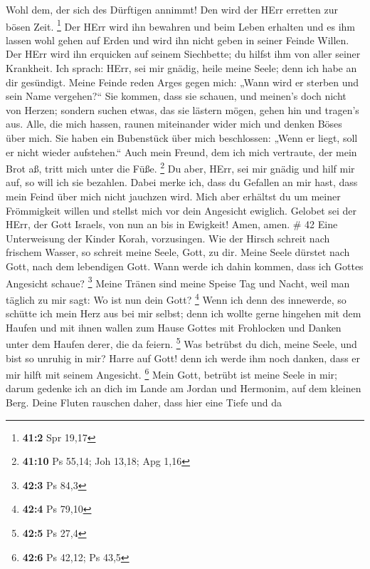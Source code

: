  Wohl dem, der sich des Dürftigen annimmt! Den wird der HErr
erretten zur bösen Zeit. \footnote{\textbf{41:2} Spr 19,17} 
Der HErr wird ihn bewahren und beim Leben erhalten und es ihm lassen
wohl gehen auf Erden und wird ihn nicht geben in seiner Feinde Willen.
 Der HErr wird ihn erquicken auf seinem Siechbette; du
hilfst ihm von aller seiner Krankheit.  Ich sprach: HErr,
sei mir gnädig, heile meine Seele; denn ich habe an dir gesündigt.
 Meine Feinde reden Arges gegen mich: „Wann wird er sterben
und sein Name vergehen?{}``  Sie kommen, dass sie schauen,
und meinen's doch nicht von Herzen; sondern suchen etwas, das sie
lästern mögen, gehen hin und tragen's aus.  Alle, die mich
hassen, raunen miteinander wider mich und denken Böses über mich.
 Sie haben ein Bubenstück über mich beschlossen: „Wenn er
liegt, soll er nicht wieder aufstehen.``  Auch mein Freund,
dem ich mich vertraute, der mein Brot aß, tritt mich unter die Füße.
\footnote{\textbf{41:10} Ps 55,14; Joh 13,18; Apg 1,16}  Du
aber, HErr, sei mir gnädig und hilf mir auf, so will ich sie bezahlen.
 Dabei merke ich, dass du Gefallen an mir hast, dass mein
Feind über mich nicht jauchzen wird.  Mich aber erhältst du
um meiner Frömmigkeit willen und stellst mich vor dein Angesicht
ewiglich.  Gelobet sei der HErr, der Gott Israels, von nun
an bis in Ewigkeit! Amen, amen. \# 42  Eine Unterweisung der
Kinder Korah, vorzusingen.  Wie der Hirsch schreit nach
frischem Wasser, so schreit meine Seele, Gott, zu dir. 
Meine Seele dürstet nach Gott, nach dem lebendigen Gott. Wann werde ich
dahin kommen, dass ich Gottes Angesicht schaue? \footnote{\textbf{42:3}
  Ps 84,3}  Meine Tränen sind meine Speise Tag und Nacht,
weil man täglich zu mir sagt: Wo ist nun dein Gott? \footnote{\textbf{42:4}
  Ps 79,10}  Wenn ich denn des innewerde, so schütte ich
mein Herz aus bei mir selbst; denn ich wollte gerne hingehen mit dem
Haufen und mit ihnen wallen zum Hause Gottes mit Frohlocken und Danken
unter dem Haufen derer, die da feiern. \footnote{\textbf{42:5} Ps 27,4}
 Was betrübst du dich, meine Seele, und bist so unruhig in
mir? Harre auf Gott! denn ich werde ihm noch danken, dass er mir hilft
mit seinem Angesicht. \footnote{\textbf{42:6} Ps 42,12; Ps 43,5}
 Mein Gott, betrübt ist meine Seele in mir; darum gedenke
ich an dich im Lande am Jordan und Hermonim, auf dem kleinen Berg.
 Deine Fluten rauschen daher, dass hier eine Tiefe und da
